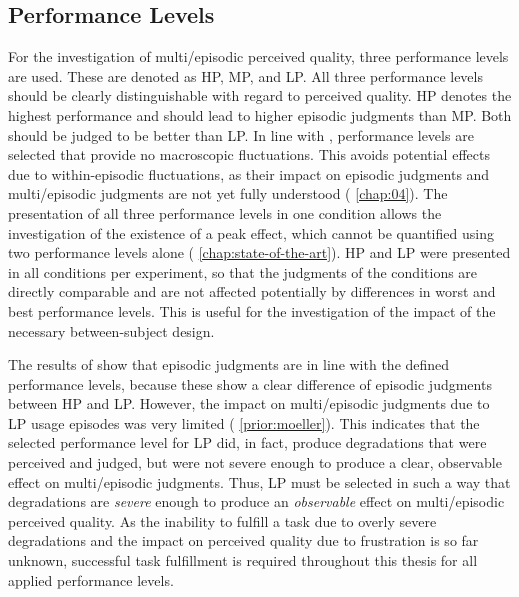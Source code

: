 \subsection{Performance Levels}
For the investigation of multi\-/episodic perceived quality, three performance levels are used.
These are denoted as \acf{HP}, \acf{MP}, and \acf{LP}.
All three performance levels should be clearly distinguishable with regard to perceived quality.
\ac{HP} denotes the highest performance and should lead to higher episodic judgments than \ac{MP}.
Both should be judged to be better than \ac{LP}.
In line with \citet{moller_single-call_2011}, performance levels are selected that provide no macroscopic fluctuations.
This avoids potential effects due to within-episodic fluctuations, as their impact on episodic judgments and multi\-/episodic judgments are not yet fully understood (\cf{} \autoref{chap:04}).
The presentation of all three performance levels in one condition allows the investigation of the existence of a peak effect, which cannot be quantified using two performance levels alone (\cf{} \autoref{chap:state-of-the-art}).
\ac{HP} and \ac{LP} were presented in all conditions per experiment, so that the judgments of the conditions are directly comparable and are not affected potentially by differences in worst and best performance levels.
This is useful for the investigation of the impact of the necessary between-subject design.

The results of \citet{moller_single-call_2011} show that episodic judgments are in line with the defined performance levels, because these show a clear difference of episodic judgments between \ac{HP} and \ac{LP}.
However, the impact on multi\-/episodic judgments due to \ac{LP} usage episodes was very limited (\cf{} \autoref{prior:moeller}).
This indicates that the selected performance level for \ac{LP} did, in fact, produce degradations that were perceived and judged, but were not severe enough to produce a clear, observable effect on multi\-/episodic judgments.
Thus, \ac{LP} must be selected in such a way that degradations are \emph{severe} enough to produce an \emph{observable} effect on multi\-/episodic perceived quality.
As the inability to fulfill a task due to overly severe degradations and the impact on perceived quality due to frustration is so far unknown, successful task fulfillment is required throughout this thesis for all applied performance levels.

